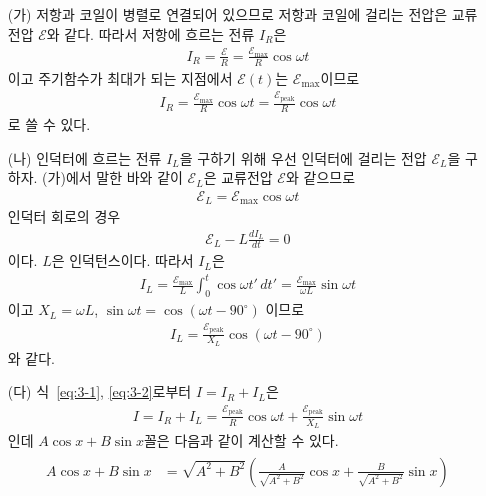 \documentclass[tightenlines,floatfix,nofootinbib,superscriptaddress,fleqn]{revtex4}
\begin{document}
\begin{itemize}
  \item[(가)]
  저항과 코일이 병렬로 연결되어 있으므로 저항과 코일에 걸리는 전압은 교류전압
  $\mathcal{E}$와 같다. 따라서 저항에 흐르는 전류 $I_R$은
  \begin{align}
    I_R = \frac{\mathcal{E}}{R} = \frac{\mathcal{E}_\mathrm{{max}}}{R}\cos\omega t
  \end{align}
  이고 주기함수가 최대가 되는 지점에서 $\mathcal{E}(t)$는 $\mathcal{E}_\mathrm{{max}}$이므로
  \begin{align}\label{eq:3-1}
    I_R =\frac{\mathcal{E_\mathrm{{max}}}}{R}\cos\omega t
    =\frac{\mathcal{E}_\mathrm{{peak}}}{R}\cos\omega t
  \end{align}
  로 쓸 수 있다.
  \item[(나)]
  인덕터에 흐르는 전류 $I_L$을 구하기 위해 우선 인덕터에 걸리는 전압 
  $\mathcal{E}_L$을 구하자. (가)에서 말한 바와 같이 $\mathcal{E}_L$은
  교류전압 $\mathcal{E}$와 같으므로
  \begin{align}
    \mathcal{E}_L = \mathcal{E}_{\mathrm{max}}\cos\omega t
  \end{align}
  인덕터 회로의 경우
  \begin{align}
    \mathcal{E}_L - L\frac{dI_L}{dt} = 0
  \end{align}
 이다. $L$은 인덕턴스이다. 따라서 $I_L$은 
 \begin{align}
  I_L = \frac{\mathcal{E_\mathrm{{max}}}}{L} \int^t_0 \cos \omega t'\,dt'
  =\frac{\mathcal{E_\mathrm{{max}}}}{\omega L} \sin \omega t
  \end{align}
  이고 $X_L = \omega L$, $\sin \omega t = \cos (\omega t-90^\circ)$ 이므로
  \begin{align}\label{eq:3-2}
    I_L = \frac{\mathcal{E_\mathrm{{peak}}}}{X_L} \cos (\omega t-90^\circ)
  \end{align}
  와 같다.
  \item[(다)]
  식~\eqref{eq:3-1}, \eqref{eq:3-2}로부터 $I= I_R+I_L$은
  \begin{align}
    I = I_R+I_L = \frac{\mathcal{E}_\mathrm{{peak}}}{R}\cos\omega t
    +\frac{\mathcal{E_\mathrm{{peak}}}}{X_L} \sin \omega t
  \end{align}
  인데 $A\cos x+B\sin x$꼴은 다음과 같이 계산할 수 있다.
  \begin{align}
    \begin{split}
      A\cos x+B\sin x &= \sqrt{A^2+B^2}\left(\frac{A}{\sqrt{A^2+B^2}}\cos x
      +\frac{B}{\sqrt{A^2+B^2}}\sin x\right)  \\

\end{split}
\end{align}
\end{itemize}
\end{document}
